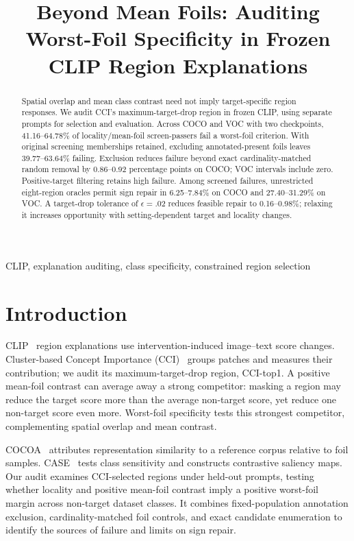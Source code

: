 \documentclass[10pt]{article}
\title{Beyond Mean Foils: Auditing Worst-Foil Specificity in Frozen CLIP Region Explanations}
\begin{document}
\maketitle
\begin{abstract}
Spatial overlap and mean class contrast need not imply target-specific region
responses. We audit CCI's maximum-target-drop region in frozen CLIP, using
separate prompts for selection and evaluation. Across COCO and VOC with two
checkpoints, 41.16--64.78\% of locality/mean-foil screen-passers fail a worst-foil
criterion. With original screening memberships retained, excluding annotated-present
foils leaves 39.77--63.64\% failing. Exclusion reduces failure beyond exact
cardinality-matched random removal by 0.86--0.92 percentage points on COCO;
VOC intervals include zero. Positive-target filtering retains high failure.
Among screened failures, unrestricted eight-region oracles permit sign repair
in 6.25--7.84\% on COCO and 27.40--31.29\% on VOC. A target-drop tolerance
of $\epsilon=.02$ reduces feasible repair to 0.16--0.98\%; relaxing it increases
opportunity with setting-dependent target and locality changes.
\end{abstract}
\begin{keywords}
CLIP, explanation auditing, class specificity, constrained region selection
\end{keywords}

\section{Introduction}
CLIP~\cite{radford2021clip} region explanations use intervention-induced
image--text score changes. Cluster-based Concept Importance
(CCI)~\cite{agarwal2025cci} groups patches and measures their contribution;
we audit its maximum-target-drop region, CCI-top1. A positive mean-foil
contrast can average away a strong competitor: masking a region may reduce
the target score more than the average non-target score, yet reduce one
non-target score even more. Worst-foil specificity tests this strongest
competitor, complementing spatial overlap and mean contrast.

COCOA~\cite{lin2023cocoa} attributes representation similarity to a reference
corpus relative to foil samples. CASE~\cite{williamson2025case} tests class
sensitivity and constructs contrastive saliency maps. Our audit examines
CCI-selected regions under held-out prompts, testing whether locality and
positive mean-foil contrast imply a positive worst-foil margin across
non-target dataset classes. It combines fixed-population annotation
exclusion, cardinality-matched foil controls, and exact candidate enumeration
to identify the sources of failure and limits on sign repair.
\end{document}
